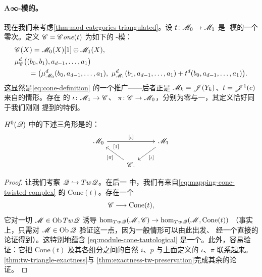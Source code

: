 \paragraph{A∞-模的\trMappingCone{}。}\label{sub:cones-of-modules}
现在我们来考虑\cref{thm:mod-categories-triangulated}。设
$t\colon\mathscr{M}_0\to\mathscr{M}_1$ 是 \trAinfty-模的一个零次\trHomomorphism。定义
$\mathscr{C}=\mathscr{C}\mathit{one}(t)$ 为如下的 \trAinfty-模：
\begin{equation}\label{eq:module-cone-definition}
\begin{aligned}
&\mathscr{C}(X)=\mathscr{M}_0(X)[1]\oplus\mathscr{M}_1(X),\\
&\mu^d_{\mathscr{C}}\bigl((b_0,b_1),a_{d-1},\ldots,a_1\bigr)\\
&\qquad=\bigl(\mu^d_{\mathscr{M}_0}(b_0,a_{d-1},\ldots,a_1),\
\mu^d_{\mathscr{M}_1}(b_1,a_{d-1},\ldots,a_1)
+t^d(b_0,a_{d-1},\ldots,a_1)\bigr).
\end{aligned}
\end{equation}
这显然是\eqref{eq:cone-definition} 的一个推广——后者正是
$\mathscr{M}_k=\mathscr{J}(Y_k)$、$t=\mathscr{J}^1(c)$ 来自\trYonedaEmbedding{}的情形。存在%
\trCanonical{}的\trModule{}\trHomomorphism{} $\iota\colon\mathscr{M}_1\to\mathscr{C}$、
$\pi\colon\mathscr{C}\to\mathscr{M}_0$，\trDegree{}分别为零与一，其定义恰好同于我们刚刚
提到的特例。

\begin{lemma}\label{thm:module-cone-exact-triangle}
$H^0(\mathscr{Q})$ 中的下述三角形是\trExact{}的：
\begin{equation*}
\begin{tikzcd}
\scr{M}_0 \ar[rr,"{[\iota]}"] && \scr{M}_1 \ar[dl,"{[\iota]}"] \\
& \scr{C}. \ar[ul,"{[\pi]}","{[1]}"{swap,pos=0.7}] &
\end{tikzcd}
\end{equation*}
\end{lemma}

\begin{proof}
让我们考察\trFull{}\trEmbedding{} $\mathscr{Q}\hookrightarrow Tw\mathscr{Q}$。在后一%
\trCategory{}中，我们有来自\eqref{eq:mapping-cone-twisted-complex} 的%
\trCanonical{}\trCone{} $\mathrm{Cone}(t)$。存在一个\trTautological{}\trMorphism
\begin{equation}\label{eq:module-cone-tautological}
\mathscr{C}\longrightarrow\mathrm{Cone}(t),
\end{equation}
它对一切 $\mathscr{M}\in\operatorname{Ob} Tw\mathscr{Q}$ 诱导\trIsomorphism{}%
$\hom_{Tw\mathscr{Q}}(\mathscr{M},\mathscr{C})\to\hom_{Tw\mathscr{Q}}(\mathscr{M},\mathrm{Cone}(t))$
（事实上，只需对 $\mathscr{M}\in\operatorname{Ob}\mathscr{Q}$ 验证这一点，因为一般情形可以由此出发、
经一个直接的\trFiltration{}论证得到）。这特别地蕴含
\eqref{eq:module-cone-tautological} 是一个\trIsomorphism。此外，容易验证：它把
$\mathrm{Cone}(t)$ 及其各组分之间的自然\trMorphism{} $i$、$p$ 与上面定义的
$\iota$、$\pi$ 联系起来。\cref{thm:tw-triangle-exactness}与
\cref{thm:exactness-tw-preservation}完成其余的论证。
\end{proof}

